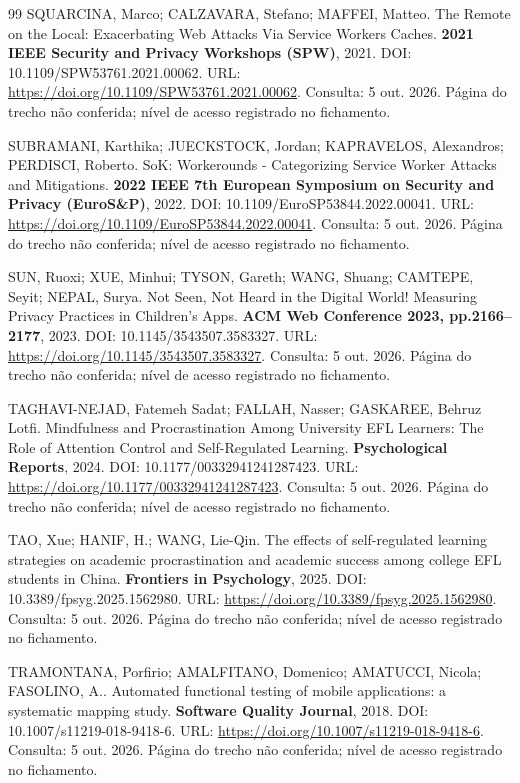 \begin{thebibliography}{99}
 SQUARCINA, Marco; CALZAVARA, Stefano; MAFFEI, Matteo. The Remote on the Local: Exacerbating Web Attacks Via Service Workers Caches. \textbf{2021 IEEE Security and Privacy Workshops (SPW)}, 2021. DOI: 10.1109/SPW53761.2021.00062. URL: \url{https://doi.org/10.1109/SPW53761.2021.00062}. Consulta: 5 out. 2026. Página do trecho não conferida; nível de acesso registrado no fichamento.


 SUBRAMANI, Karthika; JUECKSTOCK, Jordan; KAPRAVELOS, Alexandros; PERDISCI, Roberto. SoK: Workerounds - Categorizing Service Worker Attacks and Mitigations. \textbf{2022 IEEE 7th European Symposium on Security and Privacy (EuroS\&P)}, 2022. DOI: 10.1109/EuroSP53844.2022.00041. URL: \url{https://doi.org/10.1109/EuroSP53844.2022.00041}. Consulta: 5 out. 2026. Página do trecho não conferida; nível de acesso registrado no fichamento.


 SUN, Ruoxi; XUE, Minhui; TYSON, Gareth; WANG, Shuang; CAMTEPE, Seyit; NEPAL, Surya. Not Seen, Not Heard in the Digital World! Measuring Privacy Practices in Children’s Apps. \textbf{ACM Web Conference 2023, pp.2166–2177}, 2023. DOI: 10.1145/3543507.3583327. URL: \url{https://doi.org/10.1145/3543507.3583327}. Consulta: 5 out. 2026. Página do trecho não conferida; nível de acesso registrado no fichamento.


 TAGHAVI-NEJAD, Fatemeh Sadat; FALLAH, Nasser; GASKAREE, Behruz Lotfi. Mindfulness and Procrastination Among University EFL Learners: The Role of Attention Control and Self-Regulated Learning. \textbf{Psychological Reports}, 2024. DOI: 10.1177/00332941241287423. URL: \url{https://doi.org/10.1177/00332941241287423}. Consulta: 5 out. 2026. Página do trecho não conferida; nível de acesso registrado no fichamento.


 TAO, Xue; HANIF, H.; WANG, Lie-Qin. The effects of self-regulated learning strategies on academic procrastination and academic success among college EFL students in China. \textbf{Frontiers in Psychology}, 2025. DOI: 10.3389/fpsyg.2025.1562980. URL: \url{https://doi.org/10.3389/fpsyg.2025.1562980}. Consulta: 5 out. 2026. Página do trecho não conferida; nível de acesso registrado no fichamento.


 TRAMONTANA, Porfirio; AMALFITANO, Domenico; AMATUCCI, Nicola; FASOLINO, A.. Automated functional testing of mobile applications: a systematic mapping study. \textbf{Software Quality Journal}, 2018. DOI: 10.1007/s11219-018-9418-6. URL: \url{https://doi.org/10.1007/s11219-018-9418-6}. Consulta: 5 out. 2026. Página do trecho não conferida; nível de acesso registrado no fichamento.



\end{thebibliography}

